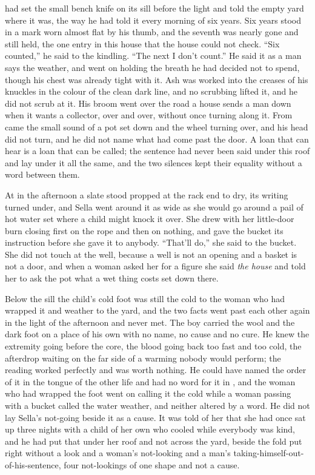  had set the small bench knife on its sill before the light and told the empty yard where it was, the way he had told it every morning of six years. Six years stood in a mark worn almost flat by his thumb, and the seventh was nearly gone and still held, the one entry in this house that the house could not check. “Six counted,” he said to the kindling. “The next I don’t count.” He said it as a man says the weather, and went on holding the breath he had decided not to spend, though his chest was already tight with it. Ash was worked into the creases of his knuckles in the colour of the clean dark line, and no scrubbing lifted it, and he did not scrub at it. His broom went over the road a house sends a man down when it wants a collector, over and over, without once turning along it. From  came the small sound of a pot set down and the wheel turning over, and his head did not turn, and he did not name what had come past the door. A loan that can hear is a loan that can be called; the sentence had never been said under this roof and lay under it all the same, and the two silences kept their equality without a word between them.

\scenebreak

At  in the afternoon a slate stood propped at the rack end to dry, its writing turned under, and Sella went around it as wide as she would go around a pail of hot water set where a child might knock it over. She drew with her little-door burn closing first on the rope and then on nothing, and gave the bucket its instruction before she gave it to anybody. “That’ll do,” she said to the bucket. She did not touch  at the well, because a well is not an opening and a basket is not a door, and when a woman asked her for a figure she said \emph{the house} and told her to ask the pot what a wet thing costs set down there.

Below the sill the child’s cold foot was still the cold to the woman who had wrapped it and weather to the yard, and the two facts went past each other again in the light of the afternoon and never met. The boy carried the wool and the dark foot on a place of his own with no name, no cause and no cure. He knew the extremity going before the core, the blood going back too fast and too cold, the afterdrop waiting on the far side of a warming nobody would perform; the reading worked perfectly and was worth nothing. He could have named the order of it in the tongue of the other life and had no word for it in , and the woman who had wrapped the foot went on calling it the cold while a woman passing with a bucket called the water weather, and neither altered by a word. He did not lay Sella’s not-going beside it as a cause. It was told of her that she had once sat up three nights with a child of her own who cooled while everybody was kind, and he had put that under her roof and not across the yard, beside the fold put right without a look and a woman’s not-looking and a man’s taking-himself-out-of-his-sentence, four not-lookings of one shape and not a cause.

